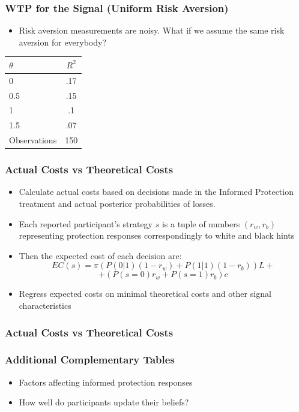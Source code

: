 \documentclass[11pt,hyperref={bookmarks=false}]{beamer}
\begin{document}
\begin{frame}
\frametitle{WTP for the Signal (Uniform Risk Aversion)}
\begin{itemize}
\item Risk aversion measurements are noisy. What if we assume the same risk aversion for everybody?
\end{itemize}
\begin{table}[htbp]\centering

\begin{tabular}{l c}
\hline\hline
                $\theta$ & $R^2$\\
\hline
0 &    .17       \\

0.5    &     .15\\

1 &     .1\\

1.5      &     .07   \\

\hline
Observations    &     150 \\
\hline\hline
\end{tabular}
\end{table}

\end{frame}


\begin{frame}
\frametitle{Actual Costs vs Theoretical Costs}
\begin{itemize}
\item Calculate actual costs based on decisions made in the Informed Protection treatment and actual posterior probabilities of losses.
\item Each reported participant's strategy $s$ is a tuple of numbers $(r_w,r_b)$ representing protection responses correspondingly to white and black hints
\item Then the expected cost of each decision are:
\small
$$EC(s)=\pi (P(0|1)(1-r_w)+P(1|1)(1-r_b))L+$$
$$+(P(s=0)r_w+P(s=1)r_b)c$$
\normalsize
\item Regress expected costs on minimal theoretical costs and other signal characteristics
\end{itemize}
\end{frame}


\begin{frame}
\frametitle{Actual Costs vs Theoretical Costs}
\footnotesize

\end{frame}


\begin{frame}
\frametitle{Additional Complementary Tables}
\begin{itemize}
\item Factors affecting informed protection responses
\item How well do participants update their beliefs?
\end{itemize}
\end{frame}
\end{document}
